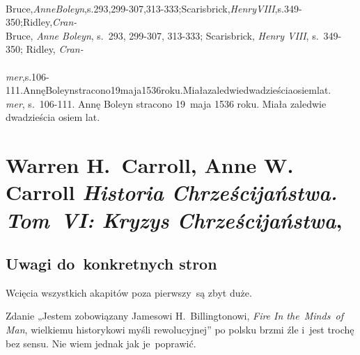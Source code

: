 \documentclass[a4paper,11pt]{article}
\numberwithin{equation}{section}
\begin{document}
\VerSpaceSix


\noindent
{} \\
\Jest Bruce,\textit{AnneBoleyn},s.293,299-307,313-333;Scarisbrick,\textit{HenryVIII},s.349-350;Ridley,\textit{Cran-} \\
\PowinnoByc Bruce, \textit{Anne Boleyn}, s.~293, 299-307, 313-333;
Scarisbrick,
\textit{Henry VIII}, s.~349-350; Ridley, \textit{Cran-} \\
 \\
\Jest
\textit{mer},s.106-111.AnnęBoleynstracono19maja1536roku.Miałazaledwiedwadzieściaosiemlat. \\
\PowinnoByc \textit{mer}, s.~106-111. Annę Boleyn stracono 19~maja 1536 roku.
Miała zaledwie dwadzieścia osiem lat. \\












\section{Warren H.~Carroll, Anne W. Carroll
  \textit{Historia Chrześcijaństwa. Tom~VI: Kryzys Chrześcijaństwa},
  \cite{CarrollCarrollHistoriaChrzecijanstwaVolVI2014}}



\subsection{Uwagi do~konkretnych stron}



\noindent
{} Wcięcia wszystkich akapitów poza pierwszy~są zbyt duże.

\VerSpaceFour





\noindent
{} Zdanie „Jestem zobowiązany Jamesowi H.~Billingtonowi,
\textit{Fire In the~Minds~of Man}, wielkiemu historykowi myśli
rewolucyjnej” po polsku brzmi źle i~jest trochę bez sensu. Nie wiem jednak
jak je~poprawić.

\VerSpaceFour
\end{document}
